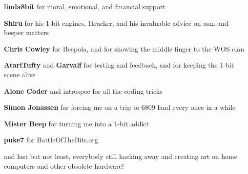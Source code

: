 \documentclass[12pt]{report}	%
\begin{document}
\textbf{linda8bit} for moral, emotional, and financial support

\textbf{Shiru} for his 1-bit engines, 1tracker, and his invaluable advice on asm and beeper matters

\textbf{Chris Cowley} for Beepola, and for showing the middle finger to the WOS clan

\textbf{AtariTufty} and \textbf{Garvalf} for testing and feedback, and for keeping the 1-bit scene alive

\textbf{Alone Coder} and {introspec} for all the coding tricks

\textbf{Simon Jonassen} for forcing me on a trip to 6809 land every once in a while

\textbf{Mister Beep} for turning me into a 1-bit addict

\textbf{puke7} for BattleOfTheBits.org

and last but not least, everybody still hacking away and creating art on home computers and other obsolete hardware!
\end{document}
